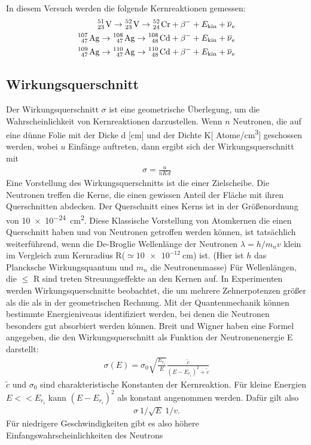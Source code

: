 \noindent
In diesem Versuch werden die folgende Kernreaktionen gemessen:
\begin{align*}
    \ce{^{51}_{23} V}   \rightarrow \ce{^{52}_{23} V}   \rightarrow \ce{^{52}_{24} Cr}  + \beta^{-} + E_\text{kin} + \overline{\nu}_\text{e}  \\
    \ce{^{107}_{47} Ag} \rightarrow \ce{^{108}_{47} Ag} \rightarrow \ce{^{108}_{48} Cd} + \beta^{-} + E_\text{kin} + \overline{\nu}_\text{e}  \\
    \ce{^{109}_{47} Ag} \rightarrow \ce{^{110}_{47} Ag} \rightarrow \ce{^{110}_{48} Cd} + \beta^{-} + E_\text{kin} + \overline{\nu}_\text{e}  \\
\end{align*}


\subsection{Wirkungsquerschnitt}
\label{sec:teo_wirkungsquerschnitt}
Der Wirkungsquerschnitt $\sigma$ ist eine geometrische Überlegung, 
um die Wahrscheinlichkeit von Kernreaktionen darzustellen.
Wenn $n$ Neutronen, die auf eine dünne Folie mit der Dicke d [\unit{\cm}] und der Dichte 
K[ Atome/\unit{\cm\cubed}] geschossen werden, wobei $u$ Einfänge auftreten, dann ergibt sich
der Wirkungsquerschnitt mit
\begin{align*}
    \sigma = \frac{u}{n K d}
\end{align*}
Eine Vorstellung des Wirkungsquerschnitts ist die einer Zielscheibe.
Die Neutronen treffen die Kerne, die einen gewissen Anteil der Fläche mit ihren
Querschnitten abdecken.
Der Querschnitt eines Kerns ist in der Größenordnung von \qty{10e-24}{\cm\squared}.
Diese Klassische Vorstellung von Atomkernen die einen Querschnitt haben und von Neutronen
getroffen werden können, ist tatsächlich weiterführend, wenn die De-Broglie Wellenlänge
der Neutronen $\lambda = h/m_n v$ klein im Vergleich zum Kernradius R($\simeq \qty{10e-12}{\cm}$) ist.
(Hier ist $h$ das Plancksche Wirkungsquantum und $m_n$ die Neutronenmasse)
Für Wellenlängen, die  $\leq$ R sind treten Streuungseffekte an den Kernen auf.
In Experimenten werden Wirkungsquerschnitte beobachtet, die um mehrere Zehnerpotenzen größer als die
als in der geometrischen Rechnung. 
Mit der Quantenmechanik können bestimmte Energieniveaus identifiziert werden, bei denen
die Neutronen besonders gut absorbiert werden können.
Breit und Wigner haben eine Formel angegeben, 
die den Wirkungsquerschnitt als Funktion der Neutronenenergie E darstellt:
\begin{align*}
    \sigma(E) = \sigma_0 \sqrt{\frac{E_{r_i}}{E}} \frac{\tilde{c}}{\left(E - E_{r_i} \right)^2  +  \tilde{c}}
\end{align*}
$\tilde{c}$ und $\sigma_0$ sind charakteristische Konstanten der Kernreaktion.
Für kleine Energien $E<< E_{r_i}$ kann $\left(E - E_{r_i} \right)^2$ als konstant angenommen werden.
Dafür gilt also
\begin{align*}
    \sigma ~ 1/ \sqrt{E} ~ 1/v . 
\end{align*}
Für niedrigere Geschwindigkeiten gibt es also höhere Einfangswahrscheinlichkeiten des Neutrons

